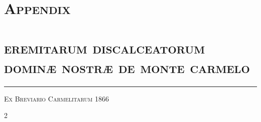 \documentclass[9pt,twoside]{extarticle}
\begin{document}
\renewcommand{\thepage}{\arabic{page}*}
\section*{\center \textsc{Appendix}\\ \large {\textsc{\\ eremitarum discalceatorum dominæ nostræ de monte carmelo}}}
\begin{center}\textcolor{black}{\rule{\linewidth}{0.5pt}} \end{center}
\begin{center} {\large \textsc{Ex Breviario Carmelitarum 1866\\ }} \end{center}
\begin{multicols}{2}
%
%
%
%
%
%


\end{multicols}
\end{document}
